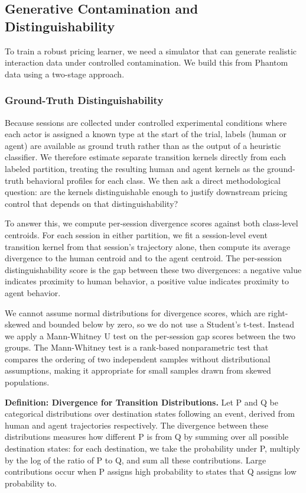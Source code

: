 \subsection{Generative Contamination and Distinguishability}

To train a robust pricing learner, we need a simulator that can generate realistic interaction data under controlled contamination. We build this from Phantom data using a two-stage approach.

\subsubsection{Ground-Truth Distinguishability}

Because sessions are collected under controlled experimental conditions where each actor is assigned a known type at the start of the trial, labels (human or agent) are available as ground truth rather than as the output of a heuristic classifier. We therefore estimate separate transition kernels directly from each labeled partition, treating the resulting human and agent kernels as the ground-truth behavioral profiles for each class. We then ask a direct methodological question: are the kernels distinguishable enough to justify downstream pricing control that depends on that distinguishability?

To answer this, we compute per-session divergence scores against both class-level centroids. For each session in either partition, we fit a session-level event transition kernel from that session's trajectory alone, then compute its average divergence to the human centroid and to the agent centroid. The per-session distinguishability score is the gap between these two divergences: a negative value indicates proximity to human behavior, a positive value indicates proximity to agent behavior.

We cannot assume normal distributions for divergence scores, which are right-skewed and bounded below by zero, so we do not use a Student's t-test. Instead we apply a Mann-Whitney U test \parencite{mann_test_1947} on the per-session gap scores between the two groups. The Mann-Whitney test is a rank-based nonparametric test that compares the ordering of two independent samples without distributional assumptions, making it appropriate for small samples drawn from skewed populations.

\textbf{Definition: Divergence for Transition Distributions.} Let P and Q be categorical distributions over destination states following an event, derived from human and agent trajectories respectively. The divergence between these distributions measures how different P is from Q by summing over all possible destination states: for each destination, we take the probability under P, multiply by the log of the ratio of P to Q, and sum all these contributions. Large contributions occur when P assigns high probability to states that Q assigns low probability to.

